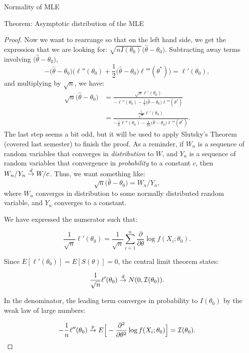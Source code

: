 \begin{frame}[allowframebreaks]{Normality of MLE}
\begin{block}{Theorem: Asymptotic distribution of the MLE}
{\begin{proof}
      Now we want to rearrange so that on the left hand side, we get the expression that we are looking for: $\sqrt{nI(\theta_0)}\big(\hat{\theta} - \theta_0\big)$.
      Subtracting away terms involving $\big(\hat{\theta} - \theta_0\big)$,
      $$
      -\big(\hat{\theta} - \theta_0\big)\Big(\ell''(\theta_0) + \frac{1}{2}\big(\hat{\theta} - \theta_0\big)\ell'''(\theta^*)\Big) = \ell'(\theta_0),
      $$
      and multiplying by $\sqrt{n}$, we have:
      \begin{align*}
        \sqrt{n}\big(\hat{\theta} - \theta_0) &= \frac{\sqrt{n}\ell'(\theta_0)}{-\ell''(\theta_0) - \frac{1}{2}\big(\hat{\theta} - \theta_0\big)\ell'''(\theta^*)} \\
        &= \frac{\frac{1}{\sqrt{n}}\ell'(\theta_0)}{-\frac{1}{n}\ell''(\theta_0) - \frac{1}{2n}\big(\hat{\theta} - \theta_0\big)\ell'''(\theta^*)}.
      \end{align*}
      The last step seems a bit odd, but it will be used to apply Slutsky's Theorem (covered last semester) to finish the proof.
      As a reminder, if $W_n$ is a sequence of random variables that converges in \emph{distribution} to $W$, and $Y_n$ is a sequence of random variables that convergence in \emph{probability} to a constant $c$, then $W_n/Y_n \overset{d}{\rightarrow} W/c$.
      Thus, we want something like:
      $$
      \sqrt{n}\big(\hat{\theta} - \theta_0) = W_n / Y_n,
      $$
      where $W_n$ converges in distribution to some normally distributed random variable, and $Y_n$ converges to a constant.

      We have expressed the numerator such that:

      $$
      \frac{1}{\sqrt{n}}\ell'(\theta_0) = \frac{1}{\sqrt{n}} \sum_{i = 1}^n \frac{\partial}{\partial \theta} \log f(X_i; \theta_0).
      $$

      Since $E[\ell'(\theta_0)] = E[S(\theta)] = 0$, the central limit theorem states:

      $$
      \frac{1}{\sqrt{n}}\ell'(\theta_0) \overset{d}{\rightarrow} N(0, \mathcal{I}(\theta_0)).
      $$

      In the denominator, the leading term converges in probability to $I(\theta_0)$ by the weak law of large numbers:

      $$
      -\frac{1}{n}\ell''(\theta_0) \overset{p}{\rightarrow} E\Big[-\frac{\partial^2}{\partial\theta^2} \log f(X_i;\theta_0)\Big] = \mathcal{I}(\theta_0).
      $$


\end{proof}}
\end{block}
\end{frame}
